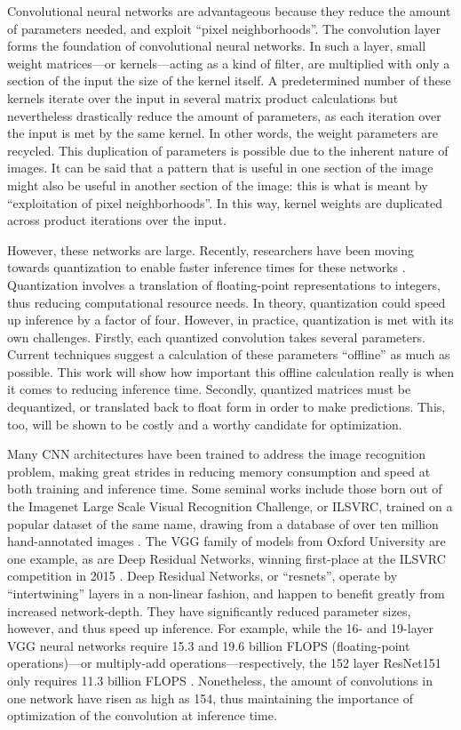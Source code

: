 Convolutional neural networks are advantageous because they reduce the amount of parameters needed, and exploit ``pixel neighborhoods''. The convolution layer forms the foundation of convolutional neural networks. In such a layer, small weight matrices---or kernels---acting as a kind of filter, are multiplied with only a section of the input the size of the kernel itself. A predetermined number of these kernels iterate over the input in several matrix product calculations but nevertheless drastically reduce the amount of parameters, as each iteration over the input is met by the same kernel. In other words, the weight parameters are recycled. This duplication of parameters is possible due to the inherent nature of images. It can be said that a pattern that is useful in one section of the image might also be useful in another section of the image: this is what is meant by ``exploitation of pixel neighborhoods''. In this way, kernel weights are duplicated across product iterations over the input.

However, these networks are large. Recently, researchers have been moving towards quantization to enable faster inference times for these networks \cite{warden_quantize}. Quantization involves a translation of floating-point representations to integers, thus reducing computational resource needs. In theory, quantization could speed up inference by a factor of four. However, in practice, quantization is met with its own challenges. Firstly, each quantized convolution takes several parameters. Current techniques suggest a calculation of these parameters ``offline'' as much as possible. This work will show how important this offline calculation really is when it comes to reducing inference time. Secondly, quantized matrices must be dequantized, or translated back to float form in order to make predictions. This, too, will be shown to be costly and a worthy candidate for optimization.

Many CNN architectures have been trained to address the image recognition problem, making great strides in reducing memory consumption and speed at both training and inference time. Some seminal works include those born out of the Imagenet Large Scale Visual Recognition Challenge, or ILSVRC, trained on a popular dataset of the same name, drawing from a database of over ten million hand-annotated images \cite{imagenet}. The VGG family of models from Oxford University \cite{return} are one example, as are Deep Residual Networks, winning first-place at the ILSVRC competition in 2015 \cite{resnets2}. Deep Residual Networks, or ``resnets'', operate by ``intertwining'' layers in a non-linear fashion, and happen to benefit greatly from increased network-depth. They have significantly reduced parameter sizes, however, and thus speed up inference. For example, while the 16- and 19-layer VGG neural networks require 15.3 and 19.6 billion FLOPS (floating-point operations)---or multiply-add operations---respectively, the 152 layer ResNet151 only requires 11.3 billion FLOPS \cite{resnets2}. Nonetheless, the amount of convolutions in one network have risen as high as 154, thus maintaining the importance of optimization of the convolution at inference time. 

